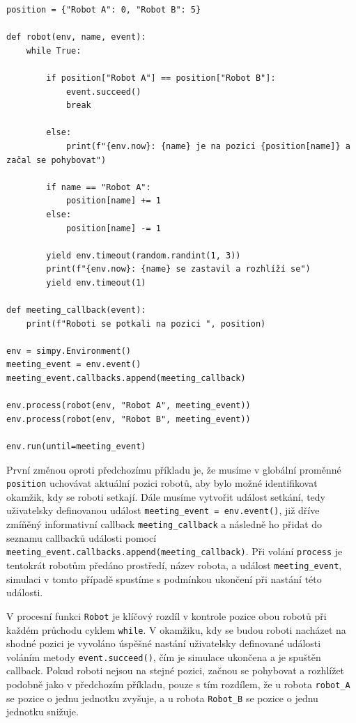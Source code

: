 \documentclass[12pt,a4paper]{article}
\begin{document}
\begin{verbatim}
position = {"Robot A": 0, "Robot B": 5}

def robot(env, name, event):
    while True:

        if position["Robot A"] == position["Robot B"]: 
            event.succeed()  
            break

        else:
            print(f"{env.now}: {name} je na pozici {position[name]} a začal se pohybovat")

        if name == "Robot A":
            position[name] += 1
        else:
            position[name] -= 1

        yield env.timeout(random.randint(1, 3))
        print(f"{env.now}: {name} se zastavil a rozhlíží se")
        yield env.timeout(1)

def meeting_callback(event):
    print(f"Roboti se potkali na pozici ", position)

env = simpy.Environment()
meeting_event = env.event()
meeting_event.callbacks.append(meeting_callback)

env.process(robot(env, "Robot A", meeting_event))
env.process(robot(env, "Robot B", meeting_event))

env.run(until=meeting_event)
\end{verbatim}

První změnou oproti předchozímu příkladu je, že musíme v globální proměnné \texttt{position} uchovávat aktuální pozici robotů, aby bylo možné identifikovat okamžik, kdy se roboti setkají. Dále musíme vytvořit událost setkání, tedy uživatelsky definovanou událost \texttt{meeting\_event = env.event()}, již dříve zmíňěný informativní callback \texttt{meeting\_callback} a následně ho přidat do seznamu callbacků události pomocí \texttt{meeting\_event.callbacks.append(meeting\_callback)}. Při volání \texttt{process} je tentokrát robotům předáno prostředí, název robota, a událost \texttt{meeting\_event}, simulaci v tomto případě spustíme s podmínkou ukončení při nastání této události.

V procesní funkci \texttt{Robot} je klíčový rozdíl v kontrole pozice obou robotů při každém průchodu  cyklem \texttt{while}. V okamžiku, kdy se budou roboti nacházet na shodné pozici je vyvoláno úspěšné nastání uživatelsky definované události voláním metody \texttt{event.succeed()}, čím je simulace ukončena a je spuštěn callback. Pokud roboti nejsou na stejné pozici, začnou se pohybovat a rozhlížet podobně jako v předchozím příkladu, pouze s tím rozdílem, že u robota \texttt{robot\_A} se pozice o jednu jednotku zvyšuje, a u robota \texttt{Robot\_B} se pozice o jednu jednotku snižuje.
\end{document}
